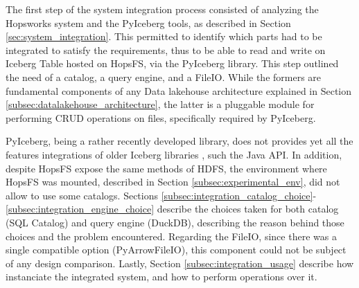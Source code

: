 The first step of the system integration process consisted of analyzing the Hopsworks system and the PyIceberg tools, as described in Section \ref{sec:system_integration}. This permitted to identify which parts had to be integrated to satisfy the requirements, thus to be able to read and write on Iceberg Table hosted on \gls{HopsFS}, via the PyIceberg library. This step outlined the need of a catalog, a query engine, and a FileIO. While the formers are fundamental components of any Data lakehouse architecture explained in Section \ref{subsec:datalakehouse_architecture}, the latter is a pluggable module for performing \gls{CRUD} operations on files, specifically required by PyIceberg.

PyIceberg, being a rather recently developed library, does not provides yet all the features integrations of older Iceberg libraries \cite{iceberg_tech_docs}, such the Java \gls{API}. In addition, despite \gls{HopsFS} expose the same methods of \gls{HDFS}, the environment where HopsFS was mounted, described in Section \ref{subsec:experimental_env}, did not allow to use some catalogs. Sections \ref{subsec:integration_catalog_choice}-\ref{subsec:integration_engine_choice} describe the choices taken for both catalog (SQL Catalog) and query engine (DuckDB), describing the reason behind those choices and the problem encountered. Regarding the FileIO, since there was a single compatible option (PyArrowFileIO), this component could not be subject of any design comparison. Lastly, Section \ref{subsec:integration_usage} describe how instanciate the integrated system, and how to perform operations over it.

